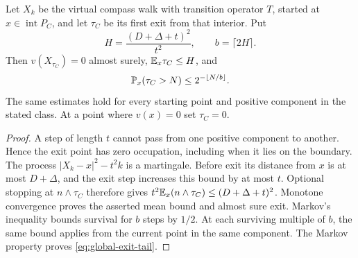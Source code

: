 \begin{lemma}
\label{lem:global-exit}
Let $X_k$ be the virtual compass walk with transition operator $T$,
started at $x\in\operatorname{int}P_C$, and let $\tau_C$ be its first
exit from that interior. Put
\begin{equation}\label{eq:global-exit-constants}
 H=\frac{(D+\Delta+t)^2}{t^2},\qquad b=\lceil2H\rceil.
\end{equation}
Then $v(X_{\tau_C})=0$ almost surely,
$\mathbb E_x\tau_C\le H$, and
\begin{equation}\label{eq:global-exit-tail}
                   \mathbb P_x(\tau_C>N)\le2^{-\lfloor N/b\rfloor}.
\end{equation}
The same estimates hold for every starting point and positive
component in the stated class. At a point where $v(x)=0$ set
$\tau_C=0$.
\end{lemma}
\begin{proof}
A step of length $t$ cannot pass from one positive component to
another. Hence the exit point has zero occupation, including when it
lies on the boundary. The process
$|X_k-x|^2-t^2k$ is a martingale. Before exit its distance from $x$ is
at most $D+\Delta$, and the exit step increases this bound by at most
$t$. Optional stopping at $n\wedge\tau_C$ therefore gives
$t^2\mathbb E_x(n\wedge\tau_C)\le(D+\Delta+t)^2$.
Monotone convergence proves the asserted mean bound and almost sure
exit. Markov's inequality bounds survival for $b$ steps by $1/2$.
At each surviving multiple of $b$, the same bound applies from the
current point in the same component. The Markov property proves
\eqref{eq:global-exit-tail}.
\end{proof}

